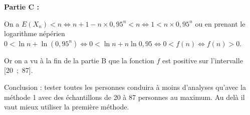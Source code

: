 \bigskip

\textbf{Partie C :}

\medskip

%
%
%
On a $E\left(X_n\right)  < n \iff n + 1 - n \times 0,95^n < n \iff 1 < n \times 0,95^n$ ou en prenant le logarithme népérien $0 < \ln n + \ln \left(0,95^n\right) \iff 0 < \ln n + n \ln 0,95 \iff 0 < f(n) \iff f(n) > 0$.

Or on a vu à la fin de la partie B que la fonction $f$ est positive sur l'intervalle [20~;~87].

Conclusion : tester toutes les personnes conduira à moins d'analyses qu'avec la méthode 1 avec des échantillons de 20 à 87 personnes au maximum. Au delà il vaut mieux utiliser la première méthode.
\bigskip


